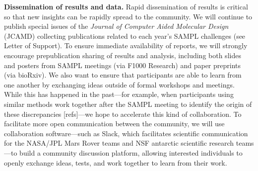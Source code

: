 \documentclass[11pt]{article}
\begin{document}
{\bf Dissemination of results and data.}
Rapid dissemination of results is critical so that new insights can be rapidly spread to the community.
We will continue to publish special issues of the \emph{Journal of Computer Aided Molecular Design} (JCAMD) collecting publications related to each year's SAMPL challenges (see Letter of Support).
To ensure immediate availability of reports, we will strongly encourage prepublication sharing of results and analysis, including both slides and posters from SAMPL meetings (via F1000 Research) and paper preprints (via bioRxiv).
We also want to ensure that participants are able to learn from one another by exchanging ideas outside of formal workshops and meetings.
While this has happened in the past---for example, when participants using similar methods work together after the SAMPL meeting to identify the origin of these discrepancies [refs]---we hope to accelerate this kind of collaboration.
To facilitate more open communication between the community, we will use collaboration software---such as Slack, which facilitates scientific communication for the NASA/JPL Mars Rover teams and NSF antarctic scientific research teams---to build a community discussion platform, 
allowing interested individuals to openly exchange ideas, tests, and work together to learn from their work.
\end{document}
